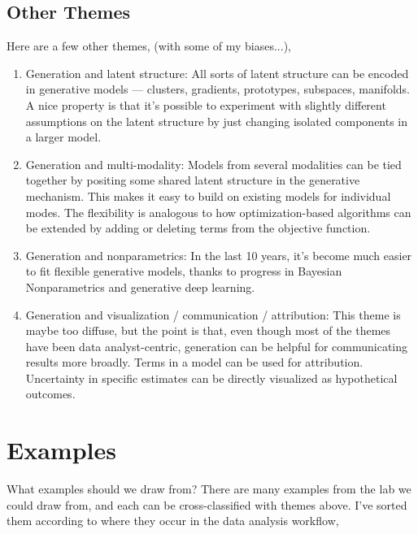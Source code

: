 \documentclass[]{article}
\begin{document}
\subsection{Other Themes}
Here are a few other themes, (with some of my biases...),
\begin{enumerate}
\item Generation and latent structure: All sorts of latent structure can be encoded in generative models — clusters, gradients, prototypes, subspaces, manifolds. A nice  property is that it’s possible to experiment with slightly different assumptions on the latent structure by just changing isolated components in a larger model.
\item Generation and multi-modality: Models from several modalities can be tied together by positing some shared latent structure in the generative mechanism. This makes it easy to build on existing models for individual modes. The flexibility is analogous to how optimization-based algorithms can be extended by adding or deleting terms from the objective function.
\item Generation and nonparametrics: In the last 10 years, it’s become much easier to fit flexible generative models, thanks to progress in Bayesian Nonparametrics and generative deep learning.
\item Generation and visualization / communication / attribution: This theme is maybe too diffuse, but the point is that, even though most of the themes have been data analyst-centric, generation can be helpful for communicating results more broadly. Terms in a model can be used for attribution. Uncertainty in specific estimates can be directly visualized as hypothetical outcomes.
\end{enumerate}

\section{Examples}

What examples should we draw from? There are many examples from the lab we could draw from, and each can be cross-classified with themes above. I’ve sorted them according to where they occur in the data analysis workflow,
\end{document}
